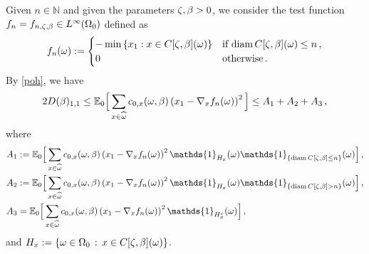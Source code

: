 \documentclass[12pt,a4paper,reqno]{amsart}
\newcommand{\bbE}{{\ensuremath{\mathbb E}} }
\newcommand{\bbN}{{\ensuremath{\mathbb N}} }
\let\O=\Omega \let\P=\Pi   \let\Ps=\Psi \let\Si=\Sigma \let\X=\Xi
\newcommand{\be}{\begin{equation}}
\newcommand{\en}{\end{equation}}
\begin{document}
Given $n \in \bbN$ and given the parameters $\zeta,\beta>0$, we consider the test function  $f_n=f_{n,\z,\b}\in L^\infty(\O_0)$ defined as \begin{equation}
\label{ftest}
f_n (\omega):=
\begin{cases}
-\min \left\{ x_1:  x\in C[\zeta,\beta](\omega)\right\}  &\text{if } {\rm diam}\,C[\zeta,\beta](\omega) \leq n \,,
\\0 &\text{otherwise}\,.
\end{cases}\end{equation}
By \eqref{poh}, we have
\be\label{st1} 
2 D(\b)_{1,1} \leq \bbE_0 \Big[ \sum_{x\in \widehat \o}  c_{0,x}(\o,\b) \left
 (x_1 - \nabla_x f_n  (\o)\right)^2\Big]
 \leq A_1+A_2+A_3 \,,
\en
where
\begin{align}
& A_1:= \bbE_0 \Big[ \sum_{x\in \widehat \o}  c_{0,x}(\o,\b) \left
  (x_1 - \nabla _x f_n  (\o)\right)^2  \mathds{1} _{H_x}(\o)
  \mathds{1}_{
  \{ {\rm diam}\, C[\z,\b] \leq n \}} (\o)
  \Big]\,,\\
  & A_2:= \bbE_0 \Big[ \sum_{x\in \widehat \o}  c_{0,x}(\o,\b) \left
  (x_1 - \nabla _x f_n  (\o)\right)^2  \mathds{1} _{H_x}(\o)
  \mathds{1}_{
  \{ {\rm diam}\, C[\z,\b] > n \}}(\o)
 \Big]\,,\\
& A_3= \bbE_0 \Big[ \sum_{x\in \widehat \o}  c_{0,x}(\o,\b) \left
 (x_1 - \nabla_x f_n  (\o)\right)^2  \mathds{1} _{H^c_x}(\o) \Big]\,,
\end{align}
and $H_x:=\{\o \in \O_0\,:\,  x\in C[\z,\b](\o)\}$.
\end{document}
